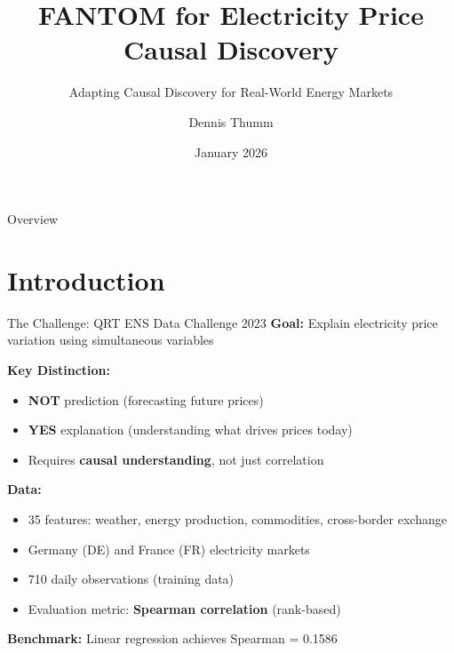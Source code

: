 \documentclass[aspectratio=169]{beamer}
\title{FANTOM for Electricity Price Causal Discovery}
\subtitle{Adapting Causal Discovery for Real-World Energy Markets}
\author{Dennis Thumm}
\date{January 2026}
\begin{document}
\begin{frame}
\titlepage
\end{frame}

\begin{frame}{Overview}
\tableofcontents
\end{frame}

\section{Introduction}

\begin{frame}{The Challenge: QRT ENS Data Challenge 2023}
\textbf{Goal:} Explain electricity price variation using simultaneous variables

\vspace{0.3cm}
\textbf{Key Distinction:}
\begin{itemize}
    \item \textbf{NOT} prediction (forecasting future prices)
    \item \textbf{YES} explanation (understanding what drives prices today)
    \item Requires \textbf{causal understanding}, not just correlation
\end{itemize}

\vspace{0.3cm}
\textbf{Data:}
\begin{itemize}
    \item 35 features: weather, energy production, commodities, cross-border exchange
    \item Germany (DE) and France (FR) electricity markets
    \item 710 daily observations (training data)
    \item Evaluation metric: \textbf{Spearman correlation} (rank-based)
\end{itemize}

\vspace{0.3cm}
\textbf{Benchmark:} Linear regression achieves Spearman = 0.1586
\end{frame}
\end{document}
